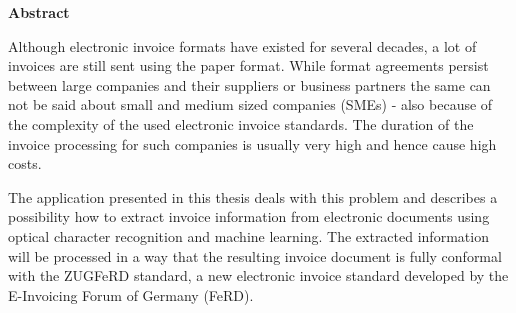 \documentclass[english,mt]{lmedoc}
\begin{document}
\vspace{5.0cm}

\begin{center}
\bfseries
Abstract
\normalfont

Although electronic invoice formats have existed for several decades, a lot of invoices are still sent using the paper format. While format agreements persist between large companies and their suppliers or business partners the same can not be said about small and medium sized companies (SMEs) - also because of the complexity of the used electronic invoice standards.
The duration of the invoice processing for such companies is usually very high and hence cause high costs.

The application presented in this thesis deals with this problem and describes a possibility how to extract invoice information from electronic documents using optical character recognition and machine learning. The extracted information will be processed in a way that the resulting invoice document is fully conformal with the ZUGFeRD standard, a new electronic invoice standard developed by the E-Invoicing Forum of Germany (FeRD). 
\end{center}

\cleardoublepage

\tableofcontents

\cleardoublepage {}
\end{document}
